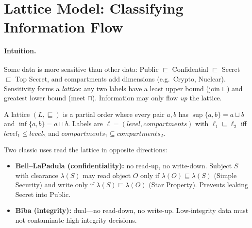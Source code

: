 \section{Lattice Model: Classifying Information Flow}
\label{sec:lattice}
\paragraph{Intuition.} Some data is more sensitive than other data: {\small Public $\sqsubset$ Confidential $\sqsubset$ Secret $\sqsubset$ Top Secret}, and compartments add dimensions (e.g.\ Crypto, Nuclear). Sensitivity forms a \emph{lattice}: any two labels have a least upper bound (join $\sqcup$) and greatest lower bound (meet $\sqcap$). Information may only flow \emph{up} the lattice.

\begin{definition}
A lattice $(L,\sqsubseteq)$ is a partial order where every pair $a,b$ has $\sup\{a,b\}=a\sqcup b$ and $\inf\{a,b\}=a\sqcap b$. Labels are $\ell=(level, compartments)$ with $\ell_1\sqsubseteq\ell_2$ iff $level_1\le level_2$ and $compartments_1\subseteq compartments_2$.
\end{definition}

Two classic uses read the lattice in opposite directions:
\begin{itemize}[leftmargin=*, itemsep=0.25em]
    \item \textbf{Bell--LaPadula (confidentiality):} no read-up, no write-down. Subject $S$ with clearance $\lambda(S)$ may read object $O$ only if $\lambda(O)\sqsubseteq\lambda(S)$ (Simple Security) and write only if $\lambda(S)\sqsubseteq\lambda(O)$ (Star Property). Prevents leaking Secret into Public.
    \item \textbf{Biba (integrity):} dual---no read-down, no write-up. Low-integrity data must not contaminate high-integrity decisions.
\end{itemize}

